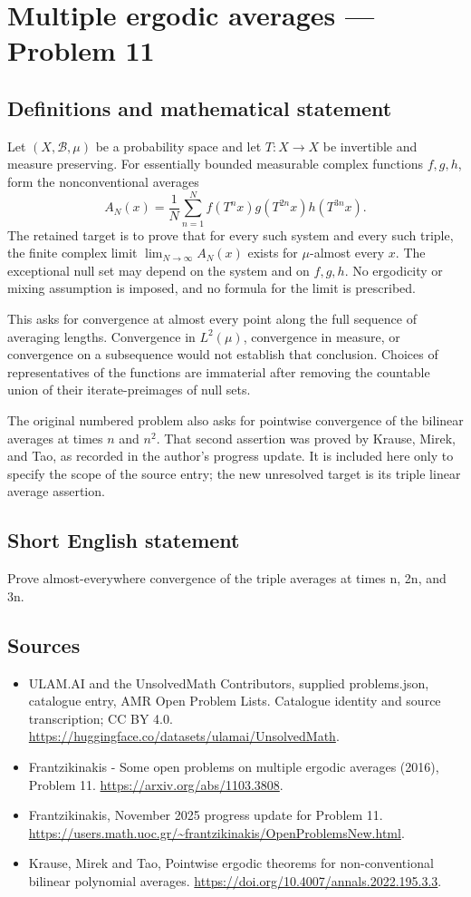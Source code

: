 \documentclass[11pt,a4paper]{article}
\begin{document}
\section*{Multiple ergodic averages — Problem 11}\label{statement}

\subsection{Definitions and mathematical statement}
Let $(X,\mathcal B,\mu)$ be a probability space and let
$T:X\to X$ be invertible and measure preserving. For
essentially bounded measurable complex functions $f,g,h$,
form the nonconventional averages
\[
 A_N(x)=\frac1N\sum_{n=1}^N
          f(T^n x)g(T^{2n}x)h(T^{3n}x).
\]
The retained target is to prove that for every such
system and every such triple, the finite complex limit
$\lim_{N\to\infty}A_N(x)$ exists for $\mu$-almost every
$x$. The exceptional null set may depend on the system
and on $f,g,h$. No ergodicity or mixing assumption is
imposed, and no formula for the limit is prescribed.

This asks for convergence at almost every point along
the full sequence of averaging lengths. Convergence in
$L^2(\mu)$, convergence in measure, or convergence on a
subsequence would not establish that conclusion. Choices
of representatives of the functions are immaterial after
removing the countable union of their iterate-preimages
of null sets.

The original numbered problem also asks for pointwise
convergence of the bilinear averages at times $n$ and $n^2$.
That second assertion was proved by Krause, Mirek, and
Tao, as recorded in the author's progress update. It is
included here only to specify the scope of the source
entry; the new unresolved target is its triple linear
average assertion.
\subsection{Short English statement}
Prove almost-everywhere convergence of the triple averages at times n, 2n, and 3n.
\subsection{Sources}
\begin{itemize}
\item[S1] ULAM.AI and the UnsolvedMath Contributors, supplied problems.json, catalogue entry, AMR Open Problem Lists. Catalogue identity and source transcription; CC BY 4.0.
\url{https://huggingface.co/datasets/ulamai/UnsolvedMath}.
\item[S2] Frantzikinakis - Some open problems on multiple ergodic averages (2016), Problem 11. 
\url{https://arxiv.org/abs/1103.3808}.
\item[S3] Frantzikinakis, November 2025 progress update for Problem 11.
\url{https://users.math.uoc.gr/~frantzikinakis/OpenProblemsNew.html}.
\item[S4] Krause, Mirek and Tao, Pointwise ergodic theorems for non-conventional bilinear polynomial averages.
\url{https://doi.org/10.4007/annals.2022.195.3.3}.
\end{itemize}
\end{document}
